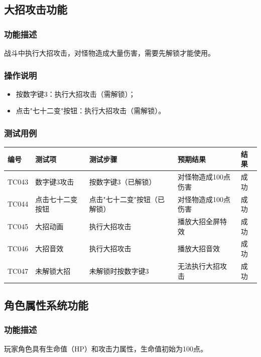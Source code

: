 \documentclass[a4paper,12pt]{article}
\begin{document}
\subsection{大招攻击功能}

\subsubsection{功能描述}
战斗中执行大招攻击，对怪物造成大量伤害，需要先解锁才能使用。

\subsubsection{操作说明}
\begin{itemize}[leftmargin=2em]
    \item 按数字键3：执行大招攻击（需解锁）；
    \item 点击"七十二变"按钮：执行大招攻击（需解锁）。
\end{itemize}

\subsubsection{测试用例}
\begin{longtable}{p{1.2cm} p{2.8cm} p{4cm} p{3.5cm} p{1.5cm}}
\toprule
\textbf{编号} & \textbf{测试项} & \textbf{测试步骤} & \textbf{预期结果} & \textbf{结果} \\
\midrule
\endhead
TC043 & 数字键3攻击 & 按数字键3（已解锁） & 对怪物造成100点伤害 & 成功 \\
TC044 & 点击七十二变按钮 & 点击"七十二变"按钮（已解锁） & 对怪物造成100点伤害 & 成功 \\
TC045 & 大招动画 & 执行大招攻击 & 播放大招全屏特效 & 成功 \\
TC046 & 大招音效 & 执行大招攻击 & 播放大招音效 & 成功 \\
TC047 & 未解锁大招 & 未解锁时按数字键3 & 无法执行大招攻击 & 成功 \\
\bottomrule
\end{longtable}

\subsection{角色属性系统功能}

\subsubsection{功能描述}
玩家角色具有生命值（HP）和攻击力属性，生命值初始为100点。
\end{document}
